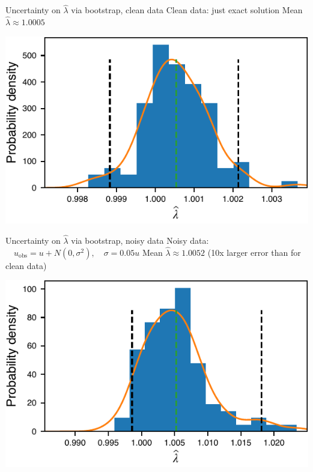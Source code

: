 \documentclass{beamer}
\def\\{}%
\begin{document}
\begin{frame}{Uncertainty on $\widehat \lambda$ via bootstrap, clean data}
\centering
Clean data: just exact solution\\
Mean $\widehat \lambda \approx 1.0005$

\vspace{0.1cm}
\includegraphics{images/heateq-bootstrap-clean}
\end{frame}

\begin{frame}{Uncertainty on $\widehat \lambda$ via bootstrap, noisy data}
\centering
Noisy data: $\quad u_{\text{obs}} = u +  N(0, \sigma^2), \quad \sigma=0.05u$\\
Mean $\widehat \lambda \approx 1.0052$ {\color{CRedD} (10x larger error than for clean data)}

\vspace{0.1cm}
\includegraphics{images/heateq-bootstrap-noise}
\end{frame}
\end{document}
